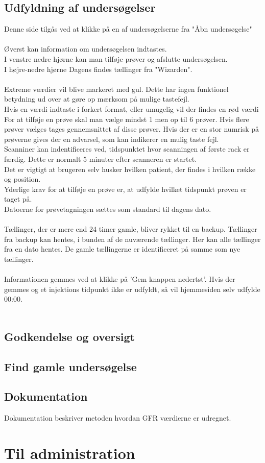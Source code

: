 \documentclass{article}
\begin{document}
\subsection{Udfyldning af undersøgelser} 
Denne side tilgås ved at klikke på en af undersøgelserne fra "Åbn undersøgelse"\\\\
Øverst kan information om undersøgelsen indtastes.\\
I venstre nedre hjørne kan man tilføje prøver og afslutte undersøgelsen.\\ 
I højre-nedre hjørne Dagens findes tællinger fra "Wizarden".\\\\
Extreme værdier vil blive markeret med gul. Dette har ingen funktionel betydning ud over at gøre op mærksom på mulige tastefejl.\\ Hvis en værdi indtaste i forkert format, eller umugelig vil der findes en rød værdi \\
For at tilføje en prøve skal man vælge mindst 1 men op til 6 prøver. Hvis flere prøver vælges tages gennemsnittet af disse prøver. Hvis der er en stor numrisk på prøverne gives der en advarsel, som kan indikerer en mulig taste fejl.\\
Scanniner kan indentificeres ved, tidspunktet hvor scanningen af første rack er færdig. Dette er normalt 5 minuter efter scanneren er startet.\\
Det er vigtigt at brugeren selv husker hvilken patient, der findes i hvilken række og position.\\
Yderlige krav for at tilføje en prøve er, at udfylde hvilket tidspunkt prøven er taget på.\\ Datoerne for prøvetagningen sættes som standard til dagens dato.\\\\
Tællinger, der er mere end 24 timer gamle, bliver rykket til en backup. Tællinger fra backup kan hentes, i bunden af de nuværende tællinger. Her kan alle tællinger fra en dato hentes. De gamle tællingerne er identificeret på samme som nye tællinger.
\\\\
Informationen gemmes ved at klikke på 'Gem knappen nedertst'. Hvis der gemmes og et injektions tidpunkt ikke er udfyldt, så vil hjemmesiden selv udfylde 00:00.\\\\
\subsection{Godkendelse og oversigt}
\subsection{Find gamle undersøgelse}
\subsection{Dokumentation}
Dokumentation beskriver metoden hvordan GFR værdierne er udregnet. 
\newpage
\section{Til administration}
\end{document}
